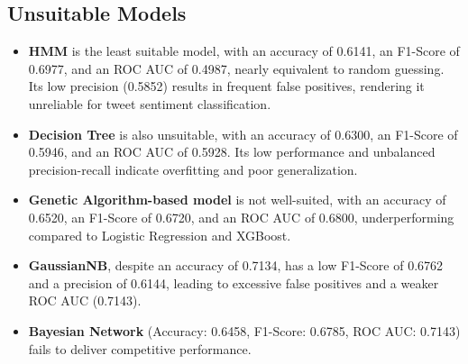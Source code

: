 \subsection{Unsuitable Models}

\begin{itemize}
    \item \textbf{HMM} is the least suitable model, with an accuracy of 0.6141, an F1-Score of 0.6977, and an ROC AUC of 0.4987, nearly equivalent to random guessing. Its low precision (0.5852) results in frequent false positives, rendering it unreliable for tweet sentiment classification.
    \item \textbf{Decision Tree} is also unsuitable, with an accuracy of 0.6300, an F1-Score of 0.5946, and an ROC AUC of 0.5928. Its low performance and unbalanced precision-recall indicate overfitting and poor generalization.
    \item \textbf{Genetic Algorithm-based model} is not well-suited, with an accuracy of 0.6520, an F1-Score of 0.6720, and an ROC AUC of 0.6800, underperforming compared to Logistic Regression and XGBoost.
    \item \textbf{GaussianNB}, despite an accuracy of 0.7134, has a low F1-Score of 0.6762 and a precision of 0.6144, leading to excessive false positives and a weaker ROC AUC (0.7143).
    \item \textbf{Bayesian Network} (Accuracy: 0.6458, F1-Score: 0.6785, ROC AUC: 0.7143) fails to deliver competitive performance.
\end{itemize}

\newpage
